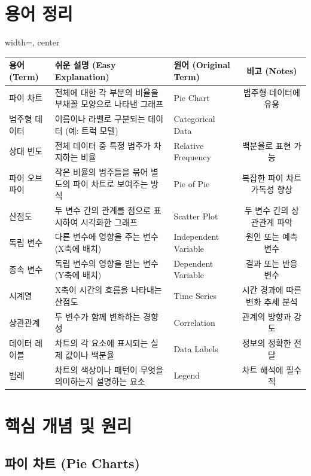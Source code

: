 \documentclass[11pt,a4paper]{book}
\theoremstyle{definition}
\begin{document}
\section{용어 정리}

\begin{adjustbox}{width=\textwidth, center}
\begin{tabular}{lllc}
\toprule
\textbf{용어 (Term)} & \textbf{쉬운 설명 (Easy Explanation)} & \textbf{원어 (Original Term)} & \textbf{비고 (Notes)} \\
\midrule
파이 차트 & 전체에 대한 각 부분의 비율을 부채꼴 모양으로 나타낸 그래프 & Pie Chart & 범주형 데이터에 유용 \\
범주형 데이터 & 이름이나 라벨로 구분되는 데이터 (예: 트럭 모델) & Categorical Data & \\
상대 빈도 & 전체 데이터 중 특정 범주가 차지하는 비율 & Relative Frequency & 백분율로 표현 가능 \\
파이 오브 파이 & 작은 비율의 범주들을 묶어 별도의 파이 차트로 보여주는 방식 & Pie of Pie & 복잡한 파이 차트 가독성 향상 \\
산점도 & 두 변수 간의 관계를 점으로 표시하여 시각화한 그래프 & Scatter Plot & 두 변수 간의 상관관계 파악 \\
독립 변수 & 다른 변수에 영향을 주는 변수 (X축에 배치) & Independent Variable & 원인 또는 예측 변수 \\
종속 변수 & 독립 변수의 영향을 받는 변수 (Y축에 배치) & Dependent Variable & 결과 또는 반응 변수 \\
시계열 & X축이 시간의 흐름을 나타내는 산점도 & Time Series & 시간 경과에 따른 변화 추세 분석 \\
상관관계 & 두 변수가 함께 변화하는 경향성 & Correlation & 관계의 방향과 강도 \\
데이터 레이블 & 차트의 각 요소에 표시되는 실제 값이나 백분율 & Data Labels & 정보의 정확한 전달 \\
범례 & 차트의 색상이나 패턴이 무엇을 의미하는지 설명하는 요소 & Legend & 차트 해석에 필수적 \\
\bottomrule
\end{tabular}
\end{adjustbox}


\section{핵심 개념 및 원리}

\subsection{파이 차트 (Pie Charts)}
\end{document}
